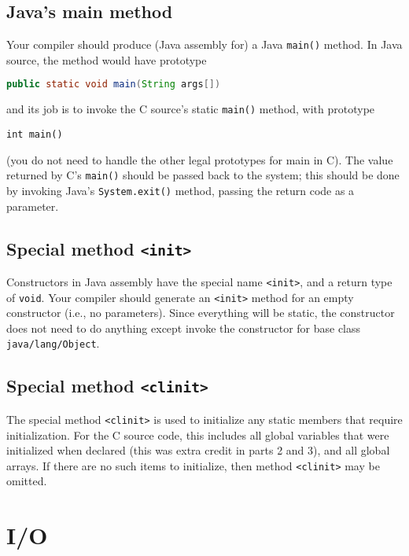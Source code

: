 \documentclass{article}
\newcommand{\parser}{2}
\newcommand{\typecheck}{3}
\begin{document}
\subsection{Java's main method}

Your compiler should produce (Java assembly for) a Java {\tt main()}
method.
In Java source, the method would have prototype
\begin{lstlisting}[language=Java, numbers=none]
public static void main(String args[])
\end{lstlisting}
and its job is to invoke the C source's static {\tt main()} method,
with prototype
\begin{lstlisting}[numbers=none]
int main()
\end{lstlisting}
(you do not need to handle the other legal prototypes for main in C).
The value returned by C's {\tt main()} should be passed back to the system;
this should be done by invoking Java's {\tt System.exit()} method,
passing the return code as a parameter.



\subsection{Special method {\tt <init>}}

Constructors in Java assembly have the special name {\tt <init>},
and a return type of {\tt void}.
Your compiler should generate an {\tt <init>} method for an empty constructor
(i.e., no parameters).
Since everything will be static, the constructor does not need to do anything
except invoke the constructor for base class {\tt java/lang/Object}.

\subsection{Special method {\tt <clinit>}}

The special method {\tt <clinit>}
is used to initialize any static members that require initialization.
For the C source code,
this includes all global variables that were initialized
when declared (this was extra credit in parts \parser{} and \typecheck{}),
and all global arrays.
If there are no such items to initialize, then method {\tt <clinit>}
may be omitted.



\section{I/O}
\end{document}
